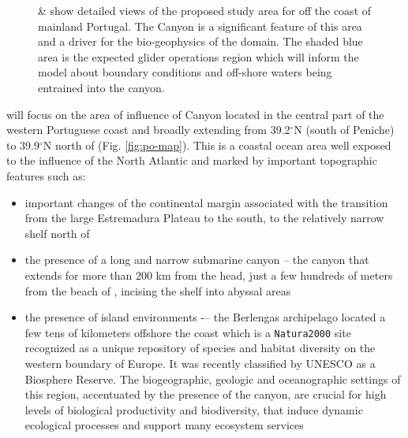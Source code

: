 \begin{figure}[!b]
  \caption{ \&  show detailed
    views of the proposed study area for \proj off the coast of
    mainland Portugal. The \naz Canyon is a significant feature of
    this area and a driver for the bio-geophysics of the domain. The
    shaded blue area is the expected glider operations region which
    will inform the model about boundary conditions and off-shore
    waters being entrained into the canyon.}
  \label{fig:studyarea-1}
\end{figure}

\proj will focus on the area of influence of \naz Canyon located in
the central part of the western Portuguese coast and broadly extending
from 39.2$^{\circ}$N (south of Peniche) to 39.9$^{\circ}$N north of
\naz (Fig. \ref{fig:po-map}). This is a coastal ocean area well
exposed to the influence of the North Atlantic and marked by
important topographic features such as:

\begin{itemize}[noitemsep,topsep=0pt,parsep=0pt,partopsep=0pt]

\item important changes of the continental margin associated with the
  transition from the large Estremadura Plateau to the south, to the
  relatively narrow shelf north of \naz

\item the presence of a long and narrow submarine canyon – the \naz
  canyon that extends for more than 200 km from the head, just a few
  hundreds of meters from the beach of \naze, incising the shelf into
  abyssal areas

\item the presence of island environments -– the Berlengas archipelago
  located a few tens of kilometers offshore the coast which is a
  \texttt{Natura2000} site recognized as a unique repository of
  species and habitat diversity on the western boundary of Europe. It
  was recently classified by UNESCO as a Biosphere Reserve. The
  biogeographic, geologic and oceanographic settings of this region,
  accentuated by the presence of the \naz canyon, are crucial for high
  levels of biological productivity and biodiversity, that induce
  dynamic ecological processes and support many ecosystem services

\end{itemize}

